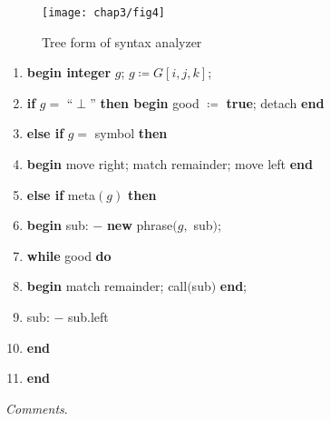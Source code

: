 \begin{figure}[ht!]
	\centering
	\texttt{[image: chap3/fig4]}
	\caption{Tree form of syntax analyzer}
	\label{fig:syntax-analyzer-1}
\end{figure}

\begin{enumerate}[nosep, label=\arabic*.]
	\item \textbf{begin integer} $g$; $g\coloneq G[i, j, k]$;
	\item \label{en:comment-label-2}
	\quad \textbf{if} $g =$ ``$\perp$'' \textbf{then begin} good $\coloneq$ \textbf{true}; detach \textbf{end}
	
	\item \quad \textbf{else if} $g =$ symbol \textbf{then}
	
	\item \label{en:comment-label-4}
	\quad \textbf{begin} move right; match remainder; move left \textbf{end}
	
	\item \quad \textbf{else if} meta$(g)$ \textbf{then}
	
	\item \label{en:comment-label-6}
	\quad \textbf{begin} sub: $-$ \textbf{new} phrase$(g,$ sub$)$;
	\item \quad \quad \textbf{while} good \textbf{do}
	
	\item \label{en:comment-label-8}
	\quad \quad \textbf{begin} match remainder; call$($sub$)$ \textbf{end};
	
	\item \label{en:comment-label-9}
	\quad \quad sub: $-$ sub.left
	
	\item \quad \quad \textbf{end}
	\item \quad \textbf{end}
\end{enumerate}
\pagebreak[4]

\noindent
\textit{Comments}.

